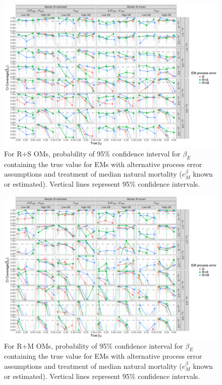 \documentclass[
  12pt,
]{article}
\begin{document}
\begin{landscape}
\begin{figure}
\begin{center}
\includegraphics[height = \textheight]{beta_E_CI_coverage_RSom}
\end{center}
\caption{For R+S OMs, probability of 95\% confidence interval for $\beta_E$ containing the true value for EMs with alternative process error assumptions and treatment of median natural mortality ($e^\beta_M$ known or estimated). Vertical lines represent 95\% confidence intervals.}\label{beta_E_CI_coverage_RSom}
\end{figure}
\end{landscape}

\begin{landscape}
\begin{figure}
\begin{center}
\includegraphics[height = \textheight]{beta_E_CI_coverage_RMom}
\end{center}
\caption{For R+M OMs, probability of 95\% confidence interval for $\beta_E$ containing the true value for EMs with alternative process error assumptions and treatment of median natural mortality ($e^\beta_M$ known or estimated). Vertical lines represent 95\% confidence intervals.}\label{beta_E_CI_coverage_RMom}
\end{figure}
\end{landscape}
\end{document}
